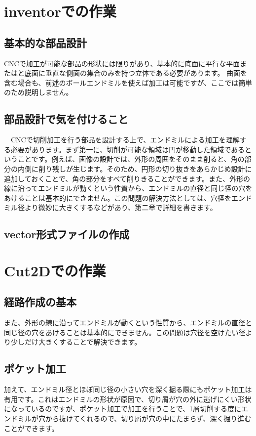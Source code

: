 \documentclass[b5paper, 9pt, twocolumn, titlepage]{jsbook}%
\begin{document}
\section{inventorでの作業}

\subsection{基本的な部品設計}
CNCで加工が可能な部品の形状には限りがあり、基本的に底面に平行な平面またはと底面に垂直な側面の集合のみを持つ立体である必要があります。
曲面を含む場合も、前述のボールエンドミルを使えば加工は可能ですが、ここでは簡単のため説明しません。
\subsection{部品設計で気を付けること}
　CNCで切削加工を行う部品を設計する上で、エンドミルによる加工を理解する必要があります。まず第一に、切削が可能な領域は円が移動した領域であるということです。例えば、画像の設計では、外形の周囲をそのまま削ると、角の部分の内側に削り残しが生じます。そのため、円形の切り抜きをあらかじめ設計に追加しておくことで、角の部分をすべて削りきることができます。また、外形の線に沿ってエンドミルが動くという性質から、エンドミルの直径と同じ径の穴をあけることは基本的にできません。この問題の解決方法としては、穴径をエンドミル径より微妙に大きくするなどがあり、第二章で詳細を書きます。

\subsection{vector形式ファイルの作成}

\section{Cut2Dでの作業}
\subsection{経路作成の基本}
{また、外形の線に沿ってエンドミルが動くという性質から、エンドミルの直径と同じ径の穴をあけることは基本的にできません。この問題は穴径を空けたい径より少しだけ大きくすることで解決できます。}
\subsection{ポケット加工}
{加えて、エンドミル径とほぼ同じ径の小さい穴を深く掘る際にもポケット加工は有用です。これはエンドミルの形状が原因で、切り屑が穴の外に逃げにくい形状になっているのですが、ポケット加工で加工を行うことで、1層切削する度にエンドミルが穴から抜けてくれるので、切り屑が穴の中にたまらず、深く掘り進むことができます。}
\end{document}
